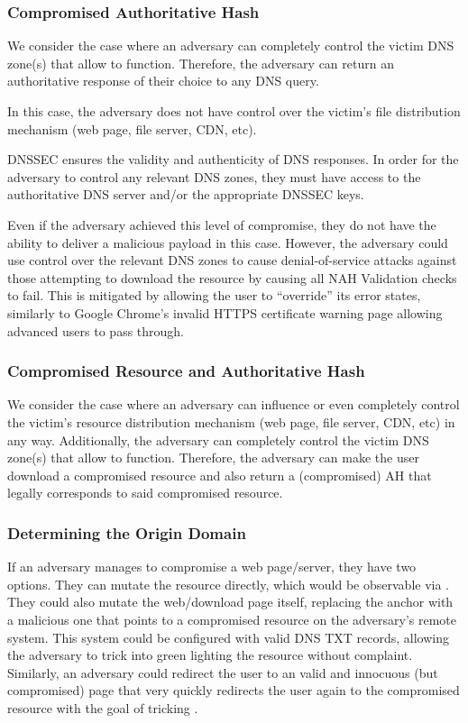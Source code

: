 \subsubsection{Compromised Authoritative Hash}

We consider the case where an adversary can completely control the victim DNS
zone(s) that allow \SYSTEM{} to function. Therefore, the adversary can return an
authoritative response of their choice to any DNS query.

In this case, the adversary does not have control over the victim's file
distribution mechanism (web page, file server, CDN, etc).

DNSSEC ensures the validity and authenticity of DNS responses. In order for the
adversary to control any relevant DNS zones, they must have access to the
authoritative DNS server and/or the appropriate DNSSEC keys.

Even if the adversary achieved this level of compromise, they do not have the
ability to deliver a malicious payload in this case. However, the adversary
could use control over the relevant DNS zones to cause denial-of-service attacks
against those attempting to download the resource by causing all NAH Validation
checks to fail. This is mitigated by \SYSTEM{} allowing the user to ``override''
its error states, similarly to Google Chrome's invalid HTTPS certificate warning
page allowing advanced users to pass through.

\subsubsection{Compromised Resource and Authoritative Hash}

We consider the case where an adversary can influence or even completely control
the victim's resource distribution mechanism (web page, file server, CDN, etc)
in any way. Additionally, the adversary can completely control the victim DNS
zone(s) that allow \SYSTEM{} to function. Therefore, the adversary can make the
user download a compromised resource and also return a (compromised) AH that
legally corresponds to said compromised resource.

\subsubsection{Determining the Origin Domain}

If an adversary manages to compromise a web page/server, they have two options.
They can mutate the resource directly, which would be observable via \SYSTEM{}.
They could also mutate the web/download page itself, replacing the anchor with a
malicious one that points to a compromised resource on the adversary's remote
system. This system could be configured with valid \SYSTEM{} DNS TXT records,
allowing the adversary to trick \SYSTEM{} into green lighting the resource
without complaint. Similarly, an adversary could redirect the user to an valid
and innocuous (but compromised) page that very quickly redirects the user again
to the compromised resource with the goal of tricking \SYSTEM{}.

